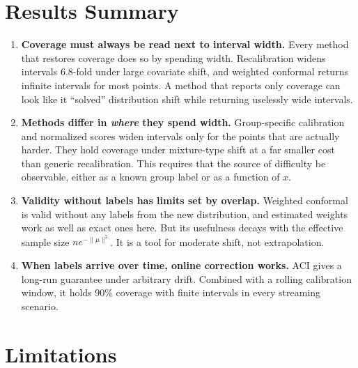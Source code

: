 \documentclass[11pt]{article}
\begin{document}
\section{Results Summary}

\begin{enumerate}
  \item \textbf{Coverage must always be read next to interval width.} Every method
    that restores coverage does so by spending width. Recalibration widens intervals
    6.8-fold under large covariate shift, and weighted conformal returns infinite
    intervals for most points. A method that reports only coverage can look like it
    ``solved'' distribution shift while returning uselessly wide intervals.
  \item \textbf{Methods differ in \emph{where} they spend width.} Group-specific
    calibration and normalized scores widen intervals only for the points that are
    actually harder. They hold coverage under mixture-type shift at a far smaller
    cost than generic recalibration. This requires that the source of difficulty be
    observable, either as a known group label or as a function of $x$.
  \item \textbf{Validity without labels has limits set by overlap.} Weighted
    conformal is valid without any labels from the new distribution, and estimated
    weights work as well as exact ones here. But its usefulness decays with the
    effective sample size $n e^{-\|\mu\|^2}$. It is a tool for moderate shift, not
    extrapolation.
  \item \textbf{When labels arrive over time, online correction works.} ACI gives a
    long-run guarantee under arbitrary drift. Combined with a rolling calibration
    window, it holds 90\% coverage with finite intervals in every streaming
    scenario.
\end{enumerate}

\section{Limitations}
\label{sec:limitations}
\end{document}
